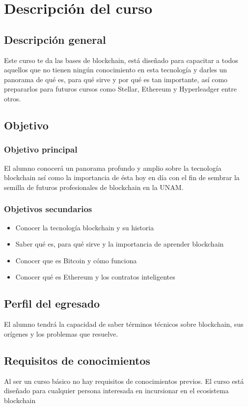 \documentclass[a4paper,12pt]{lib/pub}
\begin{document}
\putLogo
\protecoTitle

\renewcommand{\contentsname}{Índice General}
\tableofcontents
\newpage

\section{Descripción del curso}
\selectfont
\subsection{Descripción general}
Este curso te da las bases de blockchain, está diseñado para capacitar a todos aquellos que no tienen ningún conocimiento en esta tecnología y darles un panorama de qué es, para qué sirve y por qué es tan importante, así como prepararlos para futuros cursos como Stellar, Ethereum y Hyperleadger entre otros.

\subsection{Objetivo}
\subsubsection{Objetivo principal}
El alumno conocerá un panorama profundo y amplio sobre la tecnología blockchain así como la importancia de ésta hoy en día con el fin de sembrar la semilla de futuros profesionales de blockchain en la UNAM.
\subsubsection{Objetivos secundarios}
\begin{itemize}
	\item Conocer la tecnología blockchain y su historia
	\item Saber qué es, para qué sirve y la importancia de aprender blockchain
	\item Conocer que es Bitcoin y cómo funciona
	\item Conocer qué es Ethereum y los contratos inteligentes
\end{itemize}
\subsection{Perfil del egresado}
El alumno tendrá la capacidad de saber términos técnicos sobre blockchain, sus orígenes y los problemas que resuelve.
\subsection{Requisitos de conocimientos}
Al ser un curso básico no hay requisitos de conocimientos previos. El curso está diseñado para cualquier persona interesada en incursionar en el ecosistema blockchain
\end{document}
